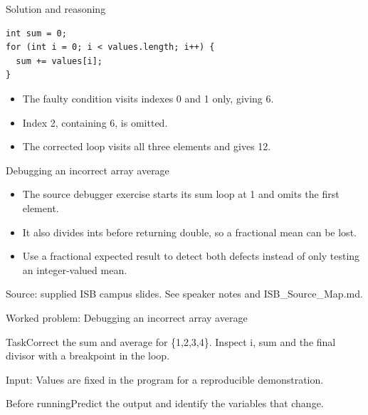 \documentclass[10pt,aspectratio=169]{beamer}
\begin{document}
\begin{frame}[fragile,t]{Solution and reasoning}
\begin{lstlisting}
int sum = 0;
for (int i = 0; i < values.length; i++) {
  sum += values[i];
}
\end{lstlisting}\vspace{1mm}\small\begin{itemize}
\item The faulty condition visits indexes 0 and 1 only, giving 6.
\item Index 2, containing 6, is omitted.
\item The corrected loop visits all three elements and gives 12.
\end{itemize}
\end{frame}

\begin{frame}[fragile,t]{Debugging an incorrect array average}
\begin{itemize}
\item The source debugger exercise starts its sum loop at 1 and omits the first element.
\item It also divides ints before returning double, so a fractional mean can be lost.
\item Use a fractional expected result to detect both defects instead of only testing an integer{-}valued mean.
\end{itemize}
\vspace{3mm}\footnotesize\textcolor{accent}{Source: supplied ISB campus slides. See speaker notes and ISB\_Source\_Map.md.}
\end{frame}

\begin{frame}[fragile,t]{Worked problem: Debugging an incorrect array average}
\begin{block}{Task}Correct the sum and average for \{1,2,3,4\}. Inspect i, sum and the final divisor with a breakpoint in the loop.\end{block}
\small Input: Values are fixed in the program for a reproducible demonstration.\par\vspace{3mm}\begin{exampleblock}{Before running}Predict the output and identify the variables that change.\end{exampleblock}
\end{frame}
\end{document}
